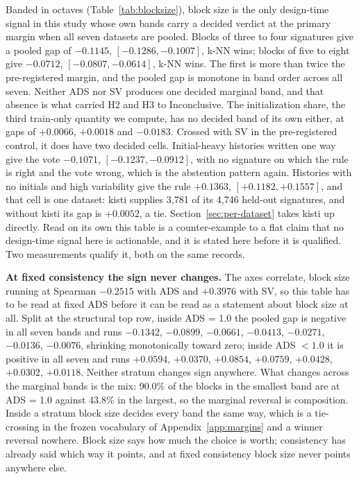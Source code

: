 \documentclass[11pt]{article}
\begin{document}
Banded in octaves (Table~\ref{tab:blocksize}), block size is the only design-time signal in this study whose own bands carry a decided verdict at the primary margin when all seven datasets are pooled. Blocks of three to four signatures give a pooled gap of
$-0.1145$, $[-0.1286, -0.1007]$, k-NN wins; blocks of five to eight give
$-0.0712$, $[-0.0807, -0.0614]$, k-NN wins. The first is more than twice the
pre-registered margin, and the pooled gap is monotone in band order across all
seven. Neither ADS nor SV produces one decided marginal band, and that absence
is what carried H2 and H3 to Inconclusive. The initialization share, the third
train-only quantity we compute, has no decided band of its own either, at gaps
of $+0.0066$, $+0.0018$ and $-0.0183$. Crossed with SV in the pre-registered control, it does have two decided cells. Initial-heavy histories written one way give the vote
$-0.1071$, $[-0.1237, -0.0912]$, with no signature on which the rule is right
and the vote wrong, which is the abstention pattern again. Histories with no
initials and high variability give the rule $+0.1363$, $[+0.1182, +0.1557]$,
and that cell is one dataset: kisti supplies 3{,}781 of its 4{,}746 held-out
signatures, and without kisti its gap is $+0.0052$, a tie.
Section~\ref{sec:per-dataset} takes kisti up directly. Read on its own this table is a
counter-example to a flat claim that no design-time signal here is actionable,
and it is stated here before it is qualified. Two measurements qualify it,
both on the same records.

\textbf{At fixed consistency the sign never changes.} The axes correlate,
block size running at Spearman $-0.2515$ with ADS and $+0.3976$ with SV, so
this table has to be read at fixed ADS before it can be read as a statement
about block size at all. Split at the structural top row, inside ADS = 1.0 the
pooled gap is negative in all seven bands and runs $-0.1342$, $-0.0899$,
$-0.0661$, $-0.0413$, $-0.0271$, $-0.0136$, $-0.0076$, shrinking monotonically
toward zero; inside ADS $< 1.0$ it is positive in all seven and runs
$+0.0594$, $+0.0370$, $+0.0854$, $+0.0759$, $+0.0428$, $+0.0302$, $+0.0118$.
Neither stratum changes sign anywhere. What changes across the marginal bands
is the mix: 90.0\% of the blocks in the smallest band are at ADS = 1.0 against
43.8\% in the largest, so the marginal reversal is composition. Inside a
stratum block size decides every band the same way, which is a tie-crossing in
the frozen vocabulary of Appendix~\ref{app:margins} and a winner reversal
nowhere. Block size says how much the choice is worth; consistency has already
said which way it points, and at fixed consistency block size never points
anywhere else.
\end{document}
